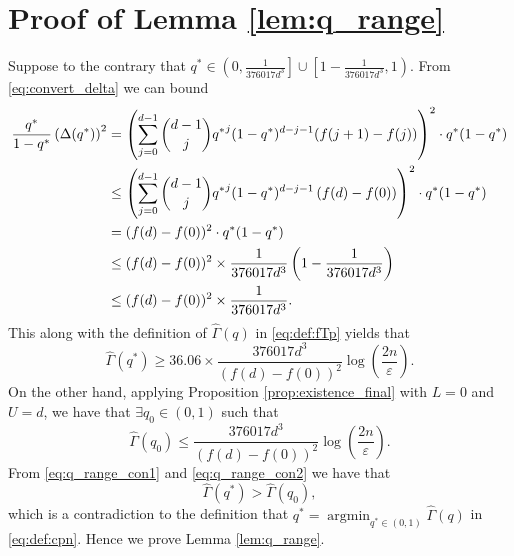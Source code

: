 \documentclass[onecolumn,letterpaper]{IEEEtran}
\DeclareMathOperator*{\argmin}{argmin}
\newcommand{\cp}{{q}}
\newcommand{\cpn}{{\cp^*}}
\newcommand{\pgapn}{{\Delta(\cpn)}}
\newcommand{\up}{{U}}
\newcommand{\lw}{{L}}
\newcommand{\ftaup}{{\hat{\Gamma}}}
\newcommand{\fTp}{\ftaup (\cp)}
\newcommand{\fTpn}{\ftaup (\cpn)}
\newcommand{\cpns}{\cp_0}
\newcommand{\fTpns}{\ftaup (\cpns)}
\begin{document}
\section{Proof of Lemma \ref{lem:q_range}}
\label{app:lem_q_range}
Suppose to the contrary that $\cpn \in \left(0,\frac{1}{376017d^3}\right]\cup \left[1-\frac{1}{376017d^3},1\right)$. From \eqref{eq:convert_delta} we can bound 
\begin{align*}
    \frac{\cpn }{1-\cpn} \left(\pgapn\right)^2&= \left( \sum\limits_{j=0}^{d-1} \binom{d-1}{j} \cpn^j (1-\cpn)^{d-j-1} ( f(j+1) - f(j) ) \right)^2 \cdot \cpn (1-\cpn) \notag \\
    &\leq\left( \sum\limits_{j=0}^{d-1} \binom{d-1}{j} \cpn^j (1-\cpn)^{d-j-1} \left( f(d) - f(0) \right) \right)^2 \cdot \cpn (1-\cpn) \notag \\
    & = (f(d) - f(0))^2 \cdot \cpn (1-\cpn)\notag\\
    &\leq  (f(d) - f(0))^2 \times \frac{1}{376017d^3}\left(1-\frac{1}{376017d^3}\right) \notag \\ 
    &\le (f(d) - f(0))^2 \times \frac{1}{376017d^3}. 
\end{align*}
This along with the definition of $\fTp$ in \eqref{eq:def:fTp} yields that 
\begin{equation}
\label{eq:q_range_con1}
    \fTpn  \geq 36.06 \times \frac{376017d^3}{ (f(d) - f(0))^2} \log \left( \frac{2n}{\varepsilon} \right).
\end{equation}
On the other hand, applying Proposition \ref{prop:existence_final} with $\lw = 0$ and $\up = d$, we have that $\exists \cpns \in (0,1)$ such that 
\begin{equation} \label{eq:q_range_con2}
    \fTpns \leq \frac{376017 d^3}{ (f(d) - f(0))^2} \log \left( \frac{2n}{\varepsilon} \right).
\end{equation}
From \eqref{eq:q_range_con1} and \eqref{eq:q_range_con2} we have that 
\begin{equation*}
    \fTpn > \fTpns,
\end{equation*}
which is a contradiction to the definition that $\cpn = \argmin_{\cpn \in (0,1)} \fTp$ in \eqref{eq:def:cpn}. Hence we prove Lemma \ref{lem:q_range}.%
\end{document}
